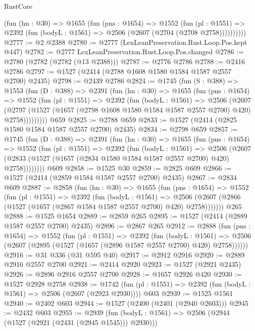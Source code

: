 \begin{lexlean}{RustCore}
\begin{coremodule}
          (fun (hn : @30) =>
          @1655
            (fun (pns : @1654) =>
            @1552
              (fun (pl : @1551) =>
              @2392 (fun (bodyL : @1561) => @2506 (@2607 (@2704 (@2708 @2758))))))))))
@2777 := @2 @2388
@2780 := @2777 (LexLeanPreservation.Rust.Loop.Pos.kept @447)
@2782 := @2777 LexLeanPreservation.Rust.Loop.Pos.changed
@2786 := @2780 (@2782 (@2782 (@13 @2388)))
@2787 := @2776 @2786
@2788 := @2416 @2786
@2797 := @1527 (@2414 (@2788 @1608 @1580 @1584 @1587 @2557 @2700) @2435)
@2798 := @2439 @2786
@2824 := @1745
    (fun (S : @388) =>
    @1553
      (fun (D : @388) =>
      @2391
        (fun (hn : @30) =>
        @1655
          (fun (pns : @1654) =>
          @1552
            (fun (pl : @1551) =>
            @2392
              (fun (bodyL : @1561) =>
              @2506
                (@2607
                  (@2797
                    (@1527 (@1657 (@2798 @1608 @1580 @1584 @1587 @2557 @2700) @420) @2758)))))))))
    @659
@2825 := @2788 @659
@2833 := @1527 (@2414 (@2825 @1580 @1584 @1587 @2557 @2700) @2435)
@2834 := @2798 @659
@2857 := @1745
    (fun (D : @388) =>
    @2391
      (fun (hn : @30) =>
      @1655
        (fun (pns : @1654) =>
        @1552
          (fun (pl : @1551) =>
          @2392
            (fun (bodyL : @1561) =>
            @2506
              (@2607 (@2833 (@1527 (@1657 (@2834 @1580 @1584 @1587 @2557 @2700) @420) @2758))))))))
    @609
@2858 := @1525 @30
@2859 := @2825 @609
@2866 := @1527 (@2414 (@2859 @1584 @1587 @2557 @2700) @2435)
@2867 := @2834 @609
@2887 := @2858
    (fun (hn : @30) =>
    @1655
      (fun (pns : @1654) =>
      @1552
        (fun (pl : @1551) =>
        @2392
          (fun (bodyL : @1561) =>
          @2506 (@2607 (@2866 (@1527 (@1657 (@2867 @1584 @1587 @2557 @2700) @420) @2758)))))))
    @265
@2888 := @1525 @1654
@2889 := @2859 @265
@2895 := @1527 (@2414 (@2889 @1587 @2557 @2700) @2435)
@2896 := @2867 @265
@2912 := @2888
    (fun (pns : @1654) =>
    @1552
      (fun (pl : @1551) =>
      @2392
        (fun (bodyL : @1561) =>
        @2506 (@2607 (@2895 (@1527 (@1657 (@2896 @1587 @2557 @2700) @420) @2758))))))
@2916 := @31 @336 (@31 @595 @40)
@2917 := @2912 @2916
@2920 := @2889 @2916 @2557 @2700
@2921 := @2414 @2920
@2923 := @1527 (@2921 @2435)
@2926 := @2896 @2916 @2557 @2700
@2928 := @1657 @2926 @420
@2930 := @1527 @2928 @2758
@2938 := @1742 (fun (pl : @1551) => @2392 (fun (bodyL : @1561) => @2506 (@2607 (@2923 @2930)))) @603
@2939 := @1525 @1561
@2940 := @2402 @603
@2944 := @1527 (@2400 (@2401 (@2940 @2603)))
@2945 := @2432 @603
@2955 := @2939
    (fun (bodyL : @1561) => @2506 (@2944 (@1527 (@2921 (@2431 (@2945 @1545))) @2930)))

\end{coremodule}
\end{lexlean}
